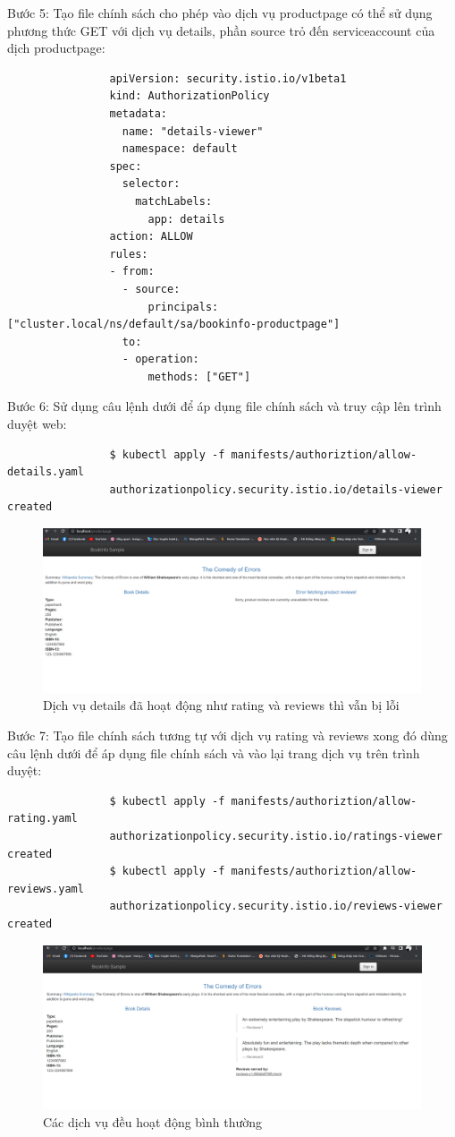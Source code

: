 \documentclass[14pt,a4paper]{book}
\begin{document}
{{				Bước 5: Tạo file chính sách cho phép vào dịch vụ productpage có thể sử dụng phương thức GET với dịch vụ details, phần source trỏ đến serviceaccount của dịch productpage:
				\begin{lstlisting}
				apiVersion: security.istio.io/v1beta1
				kind: AuthorizationPolicy
				metadata:
				  name: "details-viewer"
				  namespace: default
				spec:
				  selector:
				    matchLabels:
				      app: details
				action: ALLOW
				rules:
				- from:
				  - source:
				      principals: ["cluster.local/ns/default/sa/bookinfo-productpage"]
				  to:
				  - operation:
				      methods: ["GET"]
				\end{lstlisting}
	
			 	Bước 6: Sử dụng câu lệnh dưới để áp dụng file chính sách và truy cập lên trình duyệt web:
			 	\begin{lstlisting}
			 	$ kubectl apply -f manifests/authoriztion/allow-details.yaml 
			 	authorizationpolicy.security.istio.io/details-viewer created
			 	\end{lstlisting}

				\begin{figure}[h]
					\centering
					\includegraphics[width=0.7\linewidth]{Pics/3.3.2-p3}
					\caption{Dịch vụ details đã hoạt động như rating và reviews thì vẫn bị lỗi}
					\label{fig:3}
				\end{figure}

				Bước 7: Tạo file chính sách tương tự với dịch vụ rating và reviews xong đó dùng câu lệnh dưới để áp dụng file chính sách và vào lại trang dịch vụ trên trình duyệt:
				\begin{lstlisting}
				$ kubectl apply -f manifests/authoriztion/allow-rating.yaml 
				authorizationpolicy.security.istio.io/ratings-viewer created
				$ kubectl apply -f manifests/authoriztion/allow-reviews.yaml 
				authorizationpolicy.security.istio.io/reviews-viewer created
				\end{lstlisting}
				\begin{figure}[h]
					\centering
					\includegraphics[width=0.7\linewidth]{Pics/3.3.2-p4}
					\caption{Các dịch vụ đều hoạt động bình thường}
					\label{fig:3}
				\end{figure}
		\pagebreak
}}
\end{document}
